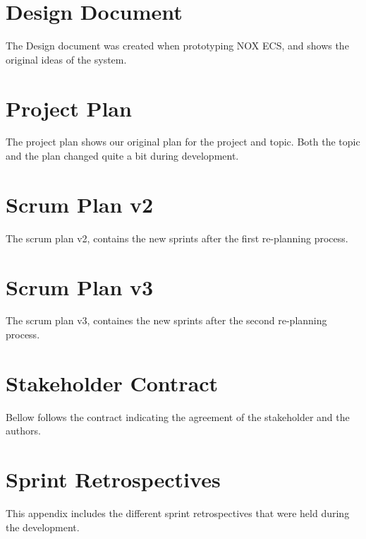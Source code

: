 \documentclass[BSP,english,oneside]{ntnuthesis/ntnubachelorthesis}
\begin{document}
\chapter{Design Document}
\label{chap:appendix_design_document}
The Design document was created when prototyping NOX ECS, and shows the original ideas of the system.


\chapter{Project Plan}
\label{chap:appendix_project_plan}
The project plan shows our original plan for the project and topic. Both the topic and the plan changed
quite a bit during development.


\chapter{Scrum Plan v2}
\label{chap:appendix_scrum_plan_v2}
The scrum plan v2, contains the new sprints after the first re-planning process.


\chapter{Scrum Plan v3}
\label{chap:appendix_scrum_plan_v3}
The scrum plan v3, containes the new sprints after the second re-planning process.


\chapter{Stakeholder Contract}
Bellow follows the contract indicating the agreement of the stakeholder and the authors.


\chapter{Sprint Retrospectives}
\label{chap:appendix_sprint_retrospectives}
This appendix includes the different sprint retrospectives that were held during the development.





\end{document}
